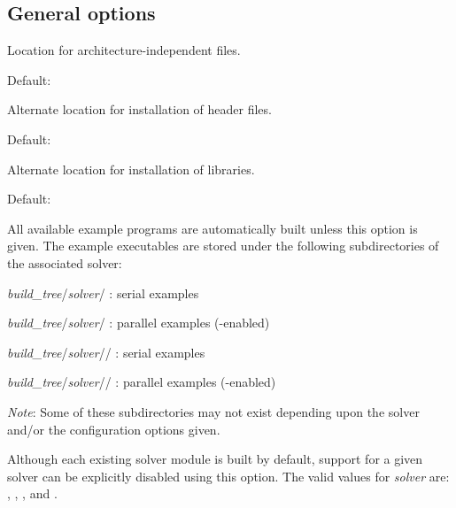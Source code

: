 \subsection*{General options}


\begin{config}
  
\item {}
  
  Location for architecture-independent files.
  
  Default: 
  
\item {}
  
  Alternate location for installation of header files.
  
  Default: 
  
\item {}
  
  Alternate location for installation of libraries.
  
  Default: 

\item {}
  
  All available example programs are automatically built unless this option is
  given. The example executables are stored under the following subdirectories
  of the associated solver: 
  
  \begin{config}
  \item {\em build\_tree}/{\em solver}/ : serial {\C} examples
  \item {\em build\_tree}/{\em solver}/ : parallel {\C} examples ({\mpi}-enabled)
  \item {\em build\_tree}/{\em solver}// : serial {\F} examples
  \item {\em build\_tree}/{\em solver}// : parallel {\F} examples ({\mpi}-enabled)
  \end{config}
  
  {\em Note}: Some of these subdirectories may not exist depending upon the
  solver and/or the configuration options given.
  
\item {}

  Although each existing solver module is built by default, support for a
  given solver can be explicitly disabled using this option. 
  The valid values for {\em solver} are: , , 
  , and .
  

\end{config}
